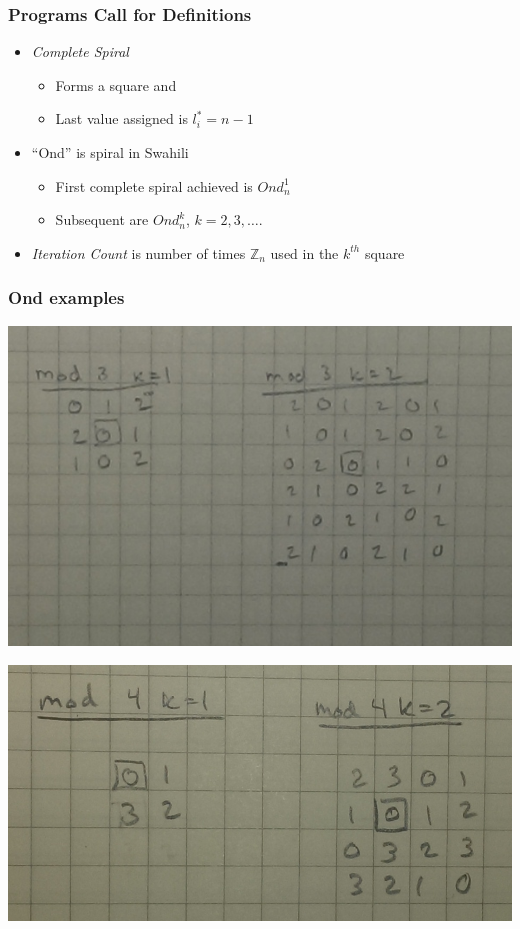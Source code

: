 \documentclass{beamer}
\theoremstyle{mydef}
\begin{document}
\frame
{
\frametitle{Programs Call for Definitions}
\begin{itemize} 
\item \emph{Complete Spiral}
\begin{itemize}
\item Forms a square and
\item Last value assigned is $l^*_i = n-1$
\end{itemize}

\item ``Ond'' is spiral in Swahili
\begin{itemize}
\item First complete spiral achieved is  $Ond^1_n$
\item Subsequent are $Ond^k_n$, $k = 2,3,\dots$.  
\end{itemize}
\item \emph{Iteration Count} is number of times $\mathbb{Z}_n$ used in the $k^{th}$ square
\end{itemize}
}

\frame
{
  \frametitle{Ond examples}
  \begin{center}
\includegraphics[scale=.28]{images/mod3.png}


\includegraphics[scale=.25]{images/mod4.png}
\end{center}
}
\end{document}
